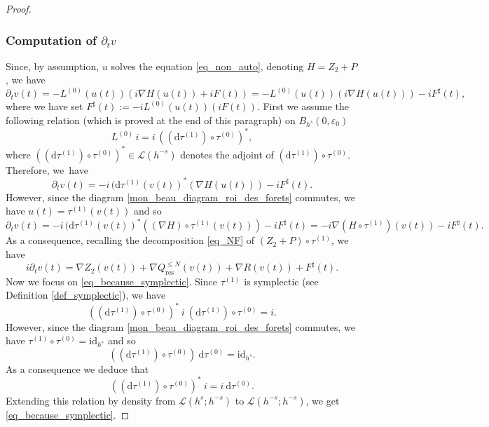 \documentclass[11pt]{article}
\theoremstyle{definition}
\begin{document}
\begin{proof}
\subsubsection*{Computation of $\partial_t v$}
Since, by assumption, $u$ solves the equation \eqref{eq_non_auto}, denoting $H=Z_2+P$, we have
\[
\partial_t v(t) = - L^{(0)}(u(t))(i \nabla H(u(t)) + iF(t)) = - L^{(0)}(u(t))(i \nabla H (u(t))) -i F^\sharp (t),
\]
where we have set $ F^\sharp (t):=-iL^{(0)}(u(t))(iF(t))$. First we assume the following relation (which is proved at the end of this paragraph) on $B_{h^s}(0,\varepsilon_0)$
\begin{equation}
\label{eq_because_symplectic}
L^{(0)} \, i= i \, ((\mathrm{d}\tau^{(1)}) \circ \tau^{(0)})^*,
\end{equation}
where $((\mathrm{d}\tau^{(1)}) \circ \tau^{(0)})^* \in \mathscr{L}(h^{-s})$ denotes the adjoint of $(\mathrm{d}\tau^{(1)}) \circ \tau^{(0)} $. Therefore, we~have
\[
\partial_t v(t) = -i \, (\mathrm{d}\tau^{(1)}(v(t))^*(\nabla H (u(t))) -i F^\sharp (t).
\]
However, since the diagram \eqref{mon_beau_diagram_roi_des_forets} commutes, we have $u(t) = \tau^{(1)} (v(t))$ and so
\[
\partial_t v(t) = -i \, (\mathrm{d}\tau^{(1)}(v(t))^*((\nabla H)\circ \tau^{(1)}(v(t))) -i F^\sharp (t) = -i \nabla (H\circ \tau^{(1)})(v(t)) -i F^\sharp (t).
\]
As a consequence, recalling the decomposition \eqref{eq_NF} of $(Z_2+P)\circ \tau^{(1)}$, we have
\begin{equation}
\label{eq_PDE_for_v}
i\partial_t v(t) = \nabla Z_2(v(t)) + \nabla Q^{\leq N}_{\mathrm{res}}(v(t)) + \nabla R(v(t)) + F^\sharp (t).
\end{equation}
Now we focus on \eqref{eq_because_symplectic}. Since $\tau^{(1)}$ is symplectic (see Definition \ref{def_symplectic}), we have
\[
((\mathrm{d}\tau^{(1)}) \circ \tau^{(0)})^* \ i \ (\mathrm{d}\tau^{(1)}) \circ \tau^{(0)} = i.
\]
However, since the diagram \eqref{mon_beau_diagram_roi_des_forets} commutes, we have $\tau^{(1)} \circ \tau^{(0)} = \mathrm{id}_{h^s}$ and so
\[
((\mathrm{d}\tau^{(1)}) \circ \tau^{(0)}) \ \mathrm{d} \tau^{(0)} = \mathrm{id}_{h^s}.
\]
As a consequence we deduce that
\[
((\mathrm{d}\tau^{(1)}) \circ \tau^{(0)})^* \ i = i \ \mathrm{d} \tau^{(0)}.
\]
Extending this relation by density from $\mathscr{L}(h^s;h^{-s})$ to $\mathscr{L}(h^{-s};h^{-s})$, we get \eqref{eq_because_symplectic}.


\end{proof}
\end{document}
